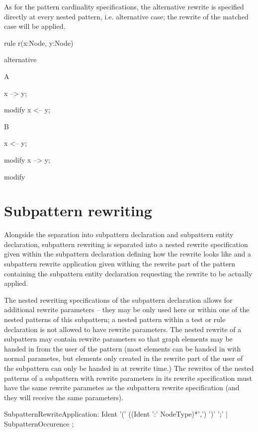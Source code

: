 \begin{example}
As for the pattern cardinality specifications, the alternative rewrite is specified directly at every nested pattern, i.e. alternative case; the rewrite of the matched case will be applied.

  \begin{grgen}
rule r(x:Node, y:Node) {
  alternative {
    A {
      x --> y;
      
      modify {
        x <-- y;
      }
    }
    B {
      x <-- y;
      
      modify {
        x --> y;
      }
    }
  }
  
  modify {
  }
}
  \end{grgen}
\end{example}


\section{Subpattern rewriting}
\label{sec:subrule}

Alongside the separation into subpattern declaration and subpattern entity declaration, subpattern rewriting is separated into a nested rewrite specification given within the subpattern declaration defining how the rewrite looks like and a subpattern rewrite application given withing the rewrite part of the pattern containing the subpattern entity declaration requesting the rewrite to be actually applied.

The nested rewriting specifications of the subpattern declaration allows for additional rewrite parameters -- they may be only used here or within one of the nested patterns of this subpattern; a nested pattern within a test or rule declaration is not allowed to have rewrite parameters. The nested rewrite of a subpattern may contain rewrite parameters so that graph elements may be handed in from the user of the pattern (most elements can be handed in with normal parametes, but elements only created in the rewrite part of the user of the subpattern can only be handed in at rewrite time.)
The rewrites of the nested patterns of a subpattern with rewrite parameters in its rewrite specification must have the same rewrite parametes as the subpattern rewrite specification (and they will receive the same parameters). 

\begin{rail}  
  SubpatternRewriteApplication: 
    Ident '(' ((Ident ':' NodeType)*',') ')' ';' |
    SubpatternOccurence ;
\end{rail}

